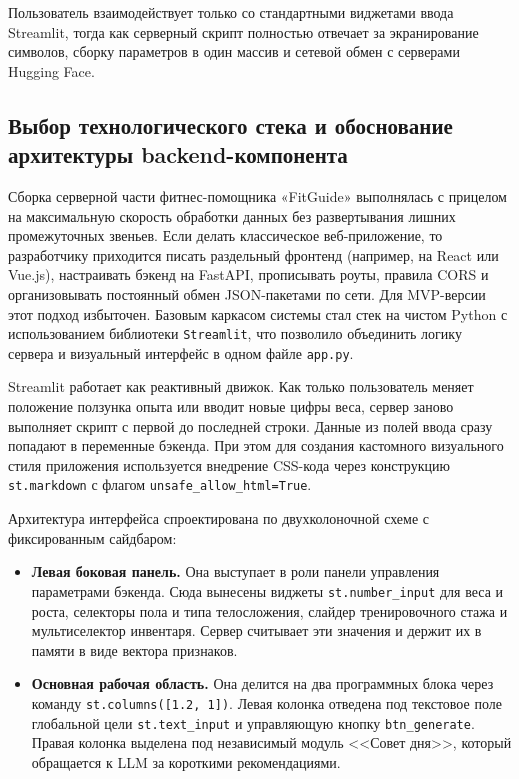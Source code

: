 \documentclass[14pt, a4paper]{extarticle}
\begin{document}
Пользователь взаимодействует только со стандартными виджетами ввода Streamlit, тогда как серверный скрипт полностью отвечает за экранирование символов, сборку параметров в один массив и сетевой обмен с серверами Hugging Face.




\subsection{Выбор технологического стека и обоснование архитектуры backend-компонента}

Сборка серверной части фитнес-помощника «FitGuide» выполнялась с прицелом на максимальную скорость обработки данных без развертывания лишних промежуточных звеньев. Если делать классическое веб-приложение, то разработчику приходится писать раздельный фронтенд (например, на React или Vue.js), настраивать бэкенд на FastAPI, прописывать роуты, правила CORS и организовывать постоянный обмен JSON-пакетами по сети. Для MVP-версии этот подход избыточен. Базовым каркасом системы стал стек на чистом Python с использованием библиотеки \texttt{Streamlit}\cite{python,streamlit_doc}, что позволило объединить логику сервера и визуальный интерфейс в одном файле \texttt{app.py}.

Streamlit работает как реактивный движок. Как только пользователь меняет положение ползунка опыта или вводит новые цифры веса, сервер заново выполняет скрипт с первой до последней строки. Данные из полей ввода сразу попадают в переменные бэкенда. При этом для создания кастомного визуального стиля приложения используется внедрение CSS-кода через конструкцию \verb|st.markdown| с флагом \verb|unsafe_allow_html=True|.

Архитектура интерфейса спроектирована по двухколоночной схеме с фиксированным сайдбаром:
\begin{itemize}
    \item \textbf{Левая боковая панель.} Она выступает в роли панели управления параметрами бэкенда. Сюда вынесены виджеты \verb|st.number_input| для веса и роста, селекторы пола и типа телосложения, слайдер тренировочного стажа и мультиселектор инвентаря. Сервер считывает эти значения и держит их в памяти в виде вектора признаков.

    \item \textbf{Основная рабочая область.} Она делится на два программных блока через команду \verb|st.columns([1.2, 1])|. Левая колонка отведена под текстовое поле глобальной цели \verb|st.text_input| и управляющую кнопку \verb|btn_generate|. Правая колонка выделена под независимый модуль <<Совет дня>>, который обращается к LLM за короткими рекомендациями.
\end{itemize}
\end{document}
